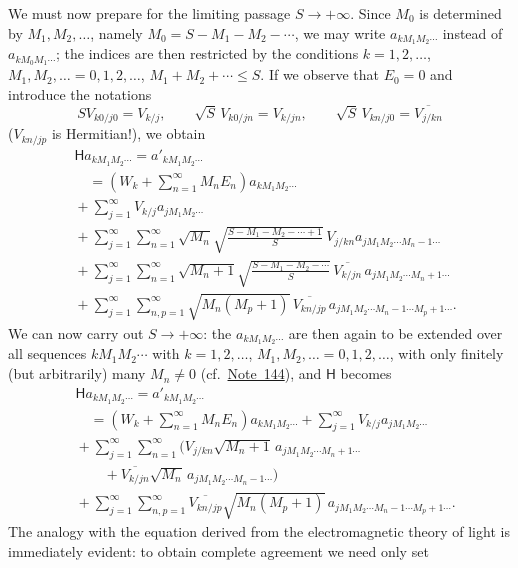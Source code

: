 \documentclass[fontsize=13pt,twoside,openany,headings=normal,parskip=false,bookmarkpackage=false,DIV=calc]{scrbook}
\begin{document}
We must now prepare for the limiting passage $S\longrightarrow+\infty$. Since $M_0$ is determined by $M_1,M_2,\ldots$, namely $M_0=S-M_1-M_2-\cdots$, we may write $a_{kM_1M_2\cdots}$ instead of $a_{kM_0M_1\cdots}$; the indices are then restricted by the conditions $k=1,2,\ldots$, $M_1,M_2,\ldots=0,1,2,\ldots$, $M_1+M_2+\cdots\le S$. If we observe that $E_0=0$ and introduce the notations
\[
 SV_{k0/j0}=V_{k/j},\qquad \sqrt S\,V_{k0/jn}=V_{k/jn},\qquad
 \sqrt S\,V_{kn/j0}=\overline{V_{j/kn}}
\]
($V_{kn/jp}$ is Hermitian!), we obtain
\begin{align*}
 &\mathsf{H}a_{kM_1M_2\cdots}=a'_{kM_1M_2\cdots}\\
 &\quad={}\left(W_k+\sum_{n=1}^{\infty}M_nE_n\right)a_{kM_1M_2\cdots}\\
 &{}+\sum_{j=1}^{\infty}V_{k/j}a_{jM_1M_2\cdots}\\
 &{}+\sum_{j=1}^{\infty}\sum_{n=1}^{\infty}\sqrt{M_n}
 \sqrt{\frac{S-M_1-M_2-\cdots+1}{S}}\,V_{j/kn}a_{jM_1M_2\cdots M_n-1\cdots}\\
 &{}+\sum_{j=1}^{\infty}\sum_{n=1}^{\infty}\sqrt{M_n+1}
 \sqrt{\frac{S-M_1-M_2-\cdots}{S}}\,\overline{V_{k/jn}}\,a_{jM_1M_2\cdots M_n+1\cdots}\\
 &{}+\sum_{j=1}^{\infty}\sum_{n,p=1}^{\infty}\sqrt{M_n(M_p+1)}\,
 \overline{V_{kn/jp}}\,a_{jM_1M_2\cdots M_n-1\cdots M_p+1\cdots}.
\end{align*}
We can now carry out $S\longrightarrow+\infty$: the $a_{kM_1M_2\cdots}$ are then again to be extended over all sequences $kM_1M_2\cdots$ with $k=1,2,\ldots$, $M_1,M_2,\ldots=0,1,2,\ldots$,
\hypertarget{origpage-150}{}with only finitely (but arbitrarily) many $M_n\ne0$ (cf.\ \hyperlink{note-144}{Note~144}), and $\mathsf{H}$ becomes
\begin{align*}
 &\mathsf{H}a_{kM_1M_2\cdots}=a'_{kM_1M_2\cdots}\\
 &\quad={}\left(W_k+\sum_{n=1}^{\infty}M_nE_n\right)a_{kM_1M_2\cdots}
 +\sum_{j=1}^{\infty}V_{k/j}a_{jM_1M_2\cdots}\\
 &{}+\sum_{j=1}^{\infty}\sum_{n=1}^{\infty}
 \bigl(V_{j/kn}\sqrt{M_n+1}\,a_{jM_1M_2\cdots M_n+1\cdots}\\
 &\qquad{}+\overline{V_{k/jn}}\sqrt{M_n}\,a_{jM_1M_2\cdots M_n-1\cdots}\bigr)\\
 &{}+\sum_{j=1}^{\infty}\sum_{n,p=1}^{\infty}\overline{V_{kn/jp}}\sqrt{M_n(M_p+1)}\,
 a_{jM_1M_2\cdots M_n-1\cdots M_p+1\cdots}.
\end{align*}
The analogy with the equation derived from the electromagnetic theory of light is immediately evident: to obtain complete agreement we need only set
\end{document}
